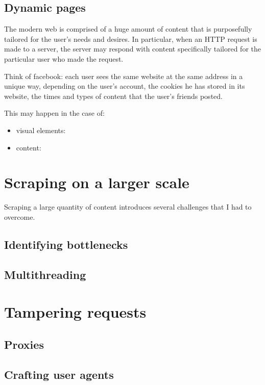 \documentclass[LaM,binding=0.6cm]{sapthesis}
\begin{document}
\subsection{Dynamic pages}

The modern web is comprised of a huge amount of content that is purposefully tailored for the user's needs and desires. In particular, when an HTTP request is made to a server, the server may respond with content specifically tailored for the particular user who made the request.

Think of facebook: each user sees the same website at the same address in a unique way, depending on the user's account, the cookies he has stored in its website, the times and types of content that the user's friends posted.

This may happen in the case of:

\begin{itemize}
	\item visual elements: 
	\item content:
\end{itemize}

\section{Scraping on a larger scale}

Scraping a large quantity of content introduces several challenges that I had to overcome. 

\subsection{Identifying bottlenecks}

\subsection{Multithreading}

\section{Tampering requests}

\subsection{Proxies}
\subsection{Crafting user agents}
\end{document}
